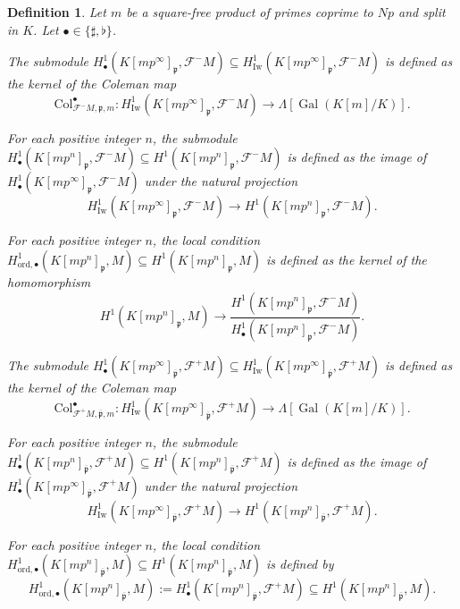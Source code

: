 \documentclass{amsart}
\numberwithin{equation}{section}
\newtheorem{defn}[theorem]{Definition}
\newcommand{\frk}{\mathfrak}
\newcommand{\Gal}{\operatorname{Gal}}
\newcommand{\ord}{\mathrm{ord}}
\newcommand{\Iw}{\mathrm{Iw}}
\begin{document}
\begin{defn}
    Let $m$ be a square-free product of primes coprime to $Np$ and split in $K$. Let $\bullet\in\lbrace \sharp,\flat\rbrace$.
        \item[i)] The submodule $H^1_{\bullet}(K[mp^\infty]_{\frk{p}},\mathscr{F}^-M)\subseteq H^1_{\Iw}(K[mp^\infty]_{\frk{p}},\mathscr{F}^-M)$ is defined as the kernel of the Coleman map
        \[
        \mathrm{Col}_{\mathscr{F}^-M,\frk{p},m}^\bullet:H^1_{\Iw}(K[mp^\infty]_{\frk{p}},\mathscr{F}^-M)\longrightarrow \Lambda[\Gal(K[m]/K)].
        \]
        \item[ii)]  For each positive integer $n$, the submodule $H^1_{\bullet}(K[mp^n]_{\frk{p}},\mathscr{F}^-M)\subseteq H^1(K[mp^n]_{\frk{p}},\mathscr{F}^-M)$ is defined as the image of $H^1_{\bullet}(K[mp^\infty]_{\frk{p}},\mathscr{F}^-M)$ under the natural projection
        \[
        H^1_{\Iw}(K[mp^\infty]_{\frk{p}},\mathscr{F}^-M)\longrightarrow H^1(K[mp^n]_{\frk{p}},\mathscr{F}^-M).
        \]
        \item[iii)]  For each positive integer $n$, the local condition $H^1_{\ord,\bullet}(K[mp^n]_{\frk{p}},M)\subseteq H^1(K[mp^n]_{\frk{p}},M)$ is defined as the kernel of the homomorphism
        \[
        H^1(K[mp^n]_{\frk{p}},M)\longrightarrow \frac{H^1(K[mp^n]_{\frk{p}},\mathscr{F}^-M)}{H^1_{\bullet}(K[mp^n]_{\frk{p}},\mathscr{F}^-M)}.
        \]
        \item[iv)]  The submodule $H^1_{\bullet}(K[mp^\infty]_{\overline{\frk{p}}},\mathscr{F}^+M)\subseteq H^1_{\Iw}(K[mp^\infty]_{\overline{\frk{p}}},\mathscr{F}^+M)$ is defined as the kernel of the Coleman map
        \[
        \mathrm{Col}_{\mathscr{F}^+M,\overline{\frk{p}},m}^\bullet:H^1_{\Iw}(K[mp^\infty]_{\overline{\frk{p}}},\mathscr{F}^+M)\longrightarrow \Lambda[\Gal(K[m]/K)].
        \]
        \item[v)]  For each positive integer $n$, the submodule $H^1_{\bullet}(K[mp^n]_{\overline{\frk{p}}},\mathscr{F}^+M)\subseteq H^1(K[mp^n]_{\overline{\frk{p}}},\mathscr{F}^+M)$ is defined as the image of $H^1_{\bullet}(K[mp^\infty]_{\overline{\frk{p}}},\mathscr{F}^+M)$ under the natural projection
        \[
        H^1_{\Iw}(K[mp^\infty]_{\overline{\frk{p}}},\mathscr{F}^+M)\longrightarrow H^1(K[mp^n]_{\overline{\frk{p}}},\mathscr{F}^+M).
        \]
        \item[vi)] For each positive integer $n$, the local condition $H^1_{\ord,\bullet}(K[mp^n]_{\overline{\frk{p}}},M)\subseteq H^1(K[mp^n]_{\overline{\frk{p}}},M)$ is defined by
        \[
        H^1_{\ord,\bullet}(K[mp^n]_{\overline{\frk{p}}},M):=H^1_{\bullet}(K[mp^n]_{\overline{\frk{p}}},\mathscr{F}^+M)\subseteq H^1(K[mp^n]_{\overline{\frk{p}}},M).
        \]
\end{defn}
\end{document}
